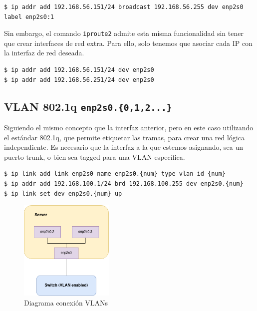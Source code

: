\documentclass[12pt]{article}
\begin{document}
	\begin{verbatim}
$ ip addr add 192.168.56.151/24 broadcast 192.168.56.255 dev enp2s0 
label enp2s0:1
	\end{verbatim}

	\par \noindent Sin embargo, el comando \texttt{iproute2} admite esta misma funcionalidad sin tener que crear interfaces de red extra. Para ello, solo tenemos que asociar cada IP con la interfaz de red deseada.
	\begin{verbatim}
$ ip addr add 192.168.56.151/24 dev enp2s0
$ ip addr add 192.168.56.251/24 dev enp2s0
	\end{verbatim}

	\subsection{VLAN 802.1q \texttt{enp2s0.\{0,1,2...\}}}
	\par \noindent Siguiendo el mismo concepto que la interfaz anterior, pero en este caso utilizando el estándar 802.1q, que permite etiquetar las tramas, para crear una red lógica independiente. Es necesario que la interfaz a la que estemos asignando, sea un puerto trunk, o bien sea tagged para una VLAN específica.
	
	\begin{verbatim}
$ ip link add link enp2s0 name enp2s0.{num} type vlan id {num}
$ ip addr add 192.168.100.1/24 brd 192.168.100.255 dev enp2s0.{num}
$ ip link set dev enp2s0.{num} up
	\end{verbatim}

	\begin{figure}[h!]
		\begin{center}
			\includegraphics[width=0.4\textwidth]{img/diag_vlan.png}
			\caption{Diagrama conexión VLANs}
		\end{center}
	\end{figure}

	\pagebreak
	
\end{document}
